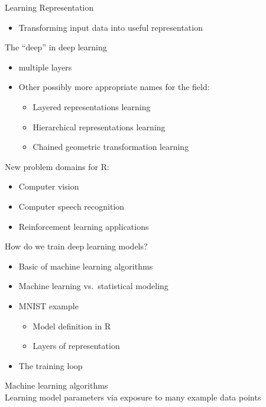 \documentclass[
]{book}
\providecommand{\tightlist}{%
  \setlength{\itemsep}{0pt}\setlength{\parskip}{0pt}}
\begin{document}
Learning Representation

\begin{itemize}
\tightlist
\item
  Transforming input data into useful representation
\end{itemize}

The ``deep'' in deep learning

\begin{itemize}
\item
  multiple layers
\item
  Other possibly more appropriate names for the field:

  \begin{itemize}
  \tightlist
  \item
    Layered representations learning
  \item
    Hierarchical representations learning
  \item
    Chained geometric transformation learning
  \end{itemize}
\end{itemize}

New problem domains for R:

\begin{itemize}
\tightlist
\item
  Computer vision
\item
  Computer speech recognition
\item
  Reinforcement learning applications
\end{itemize}

How do we train deep learning models?

\begin{itemize}
\item
  Basic of machine learning algorithms
\item
  Machine learning vs.~statistical modeling
\item
  MNIST example

  \begin{itemize}
  \tightlist
  \item
    Model definition in R
  \item
    Layers of representation
  \end{itemize}
\item
  The training loop
\end{itemize}

Machine learning algorithms\\
Learning model parameters via exposure to many example data points
\end{document}
